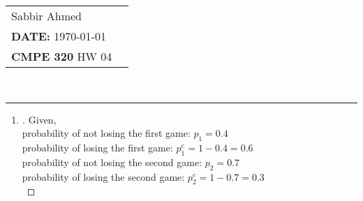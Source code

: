 \documentclass[paper=usletter, fontsize=12pt]{article}
\newcommand{\documentinfo}[5]{
    \begin{centering}
        \parbox{2in}{
        \begin{spacing}{1}
            \begin{flushleft}
                \begin{tabular}{l l}
                    #1 \\
                    #2 \\
                    #3 \\
                \end{tabular}\\
                \rule{\textwidth}{1pt}
            \end{flushleft}
        \end{spacing}
        }
    \end{centering}
}
\begin{document}
    \documentinfo{Sabbir Ahmed}{\textbf{DATE:} \today}{\textbf{CMPE 320} HW 04}
    \vspace{-0.2in}

    \begin{enumerate}

        \item
        \begin{proof}[\unskip\nopunct]
            Given,\\
            probability of not losing the first game: $p_1=0.4$\\
            probability of losing the first game: $p_1^c=1-0.4=0.6$\\
            probability of not losing the second game: $p_2=0.7$\\
            probability of losing the second game: $p_2^c=1-0.7=0.3$\\


\end{proof}
\end{enumerate}
\end{document}
